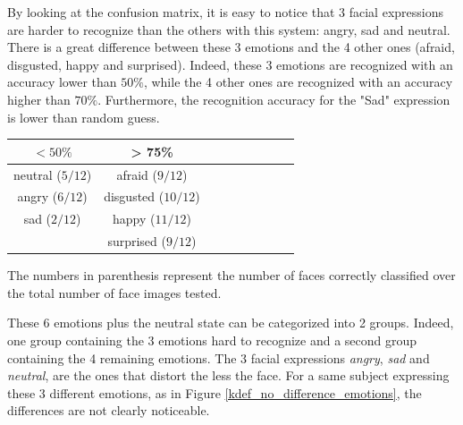 \vspace{\baselineskip}
\vspace{\baselineskip}
\noindent By looking at the confusion matrix, it is easy to notice that 3 facial expressions are harder to recognize than the others with this system: angry, sad and neutral. There is a great difference between these 3 emotions and the 4 other ones (afraid, disgusted, happy and surprised). Indeed, these 3 emotions are recognized with an accuracy lower than $ 50\% $, while the 4 other ones are recognized with an accuracy higher than $ 70\% $. Furthermore, the recognition accuracy for the "Sad" expression is lower than random guess.
\newline

\vspace{\baselineskip}
\begin {center}
\begin{tabular}{|c|c|c|c|c|c|c|c|c|}
  \hline
   $ < 50\% $ & > 75\% \\
  \hline
  neutral ($ 5/12 $) & afraid ($ 9/12 $) \\
  angry ($ 6/12 $) & disgusted ($ 10/12 $) \\
  sad ($ 2/12 $) & happy ($ 11/12 $) \\
   & surprised ($ 9/12 $) \\
  \hline
\end{tabular}
\end {center}

\vspace{\baselineskip}
\vspace{\baselineskip}
\noindent The numbers in parenthesis represent the number of faces correctly classified over the total number of face images tested.
\newline

\noindent These 6 emotions plus the neutral state can be categorized into 2 groups. Indeed, one group containing the 3 emotions hard to recognize and a second group containing the 4 remaining emotions. The 3 facial expressions \textit{angry}, \textit{sad} and \textit{neutral}, are the ones that distort the less the face. For a same subject expressing these 3 different emotions, as in Figure \ref{kdef_no_difference_emotions}, the differences are not clearly noticeable.
\newline


